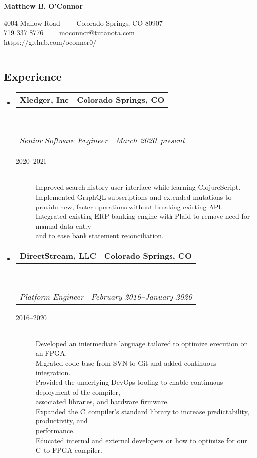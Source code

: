 \documentclass[10pt,letterpaper]{article}
\makeatletter
\newcommand{\headerrow}[2]
{\begin{tabular*}{\linewidth}{l@{\extracolsep{\fill}}r}
  #1 &
  #2 \\
\end{tabular*}}
\newcommand{\CPP}
{C\nolinebreak[4]\hspace{-.05em}\raisebox{.22ex}{\footnotesize\bf ++}}
\makeatother
\begin{document}
\begin{center}
{\LARGE \textbf{Matthew B. O'Connor}}

4004 Mallow Road\ \ \textbullet
\ \ Colorado Springs, CO 80907
\\
719 337 8776\ \ \textbullet
\ \ moconnor@tutanota.com
\\
https://github.com/oconnor0/
\end{center}

\hrule
\vspace{-0.4em}
\subsection*{Experience}

\begin{itemize}
  \parskip=0.1em

  \item
  \headerrow
    {\textbf{Xledger, Inc}}
    {\textbf{Colorado Springs, CO}}
  \\
  \headerrow
    {\emph{Senior Software Engineer}}
    {\emph{March 2020--present}}
  \begin{description}
    \item[2020--2021] \hfill \\
        Improved search history user interface while learning ClojureScript. \\
        Implemented GraphQL subscriptions and extended mutations to provide new, faster operations without breaking existing API. \\
        Integrated existing ERP banking engine with Plaid to remove need for manual data entry \\  and to ease bank statement reconciliation.
  \end{description}

  \item
  \headerrow
    {\textbf{DirectStream, LLC}}
    {\textbf{Colorado Springs, CO}}
  \\
  \headerrow
    {\emph{Platform Engineer}}
    {\emph{February 2016--January 2020}}
  \begin{description}
    \item[2016--2020] \hfill \\
        Developed an intermediate language tailored to optimize execution on an FPGA. \\
        Migrated code base from SVN to Git and added continuous integration. \\
        Provided the underlying DevOps tooling to enable continuous deployment of the compiler, \\  associated libraries, and hardware firmware. \\
        Expanded the \CPP \  compiler's standard library to increase predictability, productivity, and \\  performance. \\
        Educated internal and external developers on how to optimize for our \CPP \ to FPGA compiler.
  \end{description}


\end{itemize}
\end{document}
